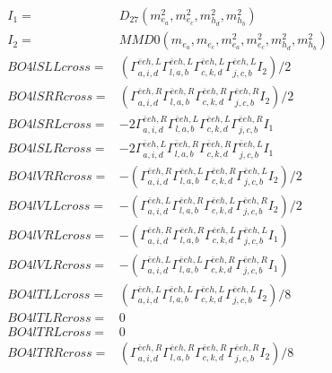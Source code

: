 \documentclass[A4,landscape]{article}
\begin{document}
\begin{align} 
I_1 = & D_{27}(m^2_{e_{{a}}}, m^2_{e_{{c}}}, m^2_{h_{{d}}}, m^2_{h_{{b}}}) \\ 
I_2 = & MMD0(m_{e_{{a}}}, m_{e_{{c}}}, m^2_{e_{{a}}}, m^2_{e_{{c}}}, m^2_{h_{{d}}}, m^2_{h_{{b}}}) \\ 
  BO4lSLLcross= & ( \Gamma^{\bar{e}e h ,L}_{a, i, d} \Gamma^{\bar{e}e h ,L}_{l, a, b} \Gamma^{\bar{e}e h ,L}_{c, k, d} \Gamma^{\bar{e}e h ,L}_{j, c, b} I_2)/2 \\ 
  BO4lSRRcross= & ( \Gamma^{\bar{e}e h ,R}_{a, i, d} \Gamma^{\bar{e}e h ,R}_{l, a, b} \Gamma^{\bar{e}e h ,R}_{c, k, d} \Gamma^{\bar{e}e h ,R}_{j, c, b} I_2)/2 \\ 
  BO4lSRLcross= & -2  \Gamma^{\bar{e}e h ,R}_{a, i, d} \Gamma^{\bar{e}e h ,L}_{l, a, b} \Gamma^{\bar{e}e h ,L}_{c, k, d} \Gamma^{\bar{e}e h ,R}_{j, c, b} I_1 \\ 
  BO4lSLRcross= & -2  \Gamma^{\bar{e}e h ,L}_{a, i, d} \Gamma^{\bar{e}e h ,R}_{l, a, b} \Gamma^{\bar{e}e h ,R}_{c, k, d} \Gamma^{\bar{e}e h ,L}_{j, c, b} I_1 \\ 
  BO4lVRRcross= & -( \Gamma^{\bar{e}e h ,R}_{a, i, d} \Gamma^{\bar{e}e h ,L}_{l, a, b} \Gamma^{\bar{e}e h ,R}_{c, k, d} \Gamma^{\bar{e}e h ,L}_{j, c, b} I_2)/2 \\ 
  BO4lVLLcross= & -( \Gamma^{\bar{e}e h ,L}_{a, i, d} \Gamma^{\bar{e}e h ,R}_{l, a, b} \Gamma^{\bar{e}e h ,L}_{c, k, d} \Gamma^{\bar{e}e h ,R}_{j, c, b} I_2)/2 \\ 
  BO4lVRLcross= & -( \Gamma^{\bar{e}e h ,R}_{a, i, d} \Gamma^{\bar{e}e h ,R}_{l, a, b} \Gamma^{\bar{e}e h ,L}_{c, k, d} \Gamma^{\bar{e}e h ,L}_{j, c, b} I_1) \\ 
  BO4lVLRcross= & -( \Gamma^{\bar{e}e h ,L}_{a, i, d} \Gamma^{\bar{e}e h ,L}_{l, a, b} \Gamma^{\bar{e}e h ,R}_{c, k, d} \Gamma^{\bar{e}e h ,R}_{j, c, b} I_1) \\ 
  BO4lTLLcross= & ( \Gamma^{\bar{e}e h ,L}_{a, i, d} \Gamma^{\bar{e}e h ,L}_{l, a, b} \Gamma^{\bar{e}e h ,L}_{c, k, d} \Gamma^{\bar{e}e h ,L}_{j, c, b} I_2)/8 \\ 
  BO4lTLRcross= & 0 \\ 
  BO4lTRLcross= & 0 \\ 
  BO4lTRRcross= & ( \Gamma^{\bar{e}e h ,R}_{a, i, d} \Gamma^{\bar{e}e h ,R}_{l, a, b} \Gamma^{\bar{e}e h ,R}_{c, k, d} \Gamma^{\bar{e}e h ,R}_{j, c, b} I_2)/8 \\ 
\end{align} 
\end{document}
